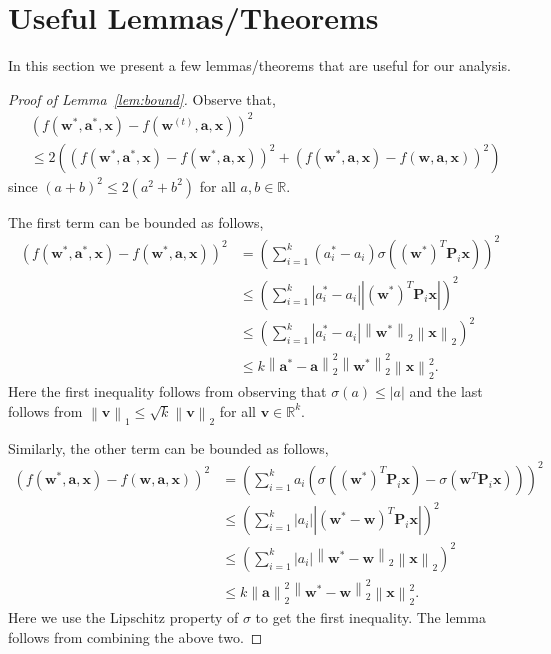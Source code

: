 \documentclass[11pt]{article}
\newcommand{\mat}[1]{\mathbf{#1}}
\newcommand{\vect}[1]{\mathbf{#1}}
\newcommand{\norm}[1]{\left\|#1\right\|}
\begin{document}



\newpage
\appendix
\section{Useful Lemmas/Theorems}\label{sec:useful_lemmas}
In this section we present a few lemmas/theorems that are useful for our analysis.

\begin{proof}[Proof of Lemma~\ref{lem:bound}]
Observe that,
\begin{align*}
&\left(f\left(\vect{w}^*, \vect{a}^*, \vect{x}\right) - f\left(\vect{w}^{\left(t\right)}, \vect{a}, \vect{x}\right)\right)^2 \\
& \leq 2\left(\left(f\left(\vect{w}^*, \vect{a}^*, \vect{x}\right) - f\left(\vect{w}^*, \vect{a}, \vect{x}\right)\right)^2 + \left(f\left(\vect{w}^*, \vect{a}, \vect{x}\right) -f\left(\vect{w}, \vect{a}, \vect{x}\right)\right)^2\right)
\end{align*}
since $\left(a + b\right)^2 \leq 2\left(a^2  + b^2\right)$ for all $a, b \in \mathbb{R}$.

The first term can be bounded as follows,
\begin{align*}
\left(f\left(\vect{w}^*, \vect{a}^*, \vect{x}\right) - f\left(\vect{w}^*, \vect{a}, \vect{x}\right)\right)^2 &= \left(\sum_{i=1}^k \left(a^*_i - a_i\right) \sigma \left(\left(\vect{w}^*\right)^T \mat{P}_i \vect{x}\right)\right)^2\\
& \leq \left(\sum_{i=1}^k |a^*_i - a_i| |\left(\vect{w}^*\right)^T \mat{P}_i \vect{x}|\right)^2\\
& \leq \left(\sum_{i=1}^k |a^*_i - a_i| \norm{\vect{w}^*}_2 \norm{\vect{x}}_2\right)^2\\
& \leq k \norm{\vect{a}^* - \vect{a}}_2^2\norm{\vect{w}^*}_2^2 \norm{\vect{x}}_2^2.
\end{align*}
Here the first inequality follows from observing that $\sigma\left(a\right) \leq |a|$ and the last follows from $\norm{\vect{v}}_1 \leq \sqrt{k} \norm{\vect{v}}_2$ for all $\vect{v} \in \mathbb{R}^k$.

Similarly, the other term can be bounded as follows,
\begin{align*}
\left(f\left(\vect{w}^*, \vect{a}, \vect{x}\right) - f\left(\vect{w}, \vect{a}, \vect{x}\right)\right)^2 &= \left(\sum_{i=1}^k a_i \left(\sigma \left(\left(\vect{w}^*\right)^T \mat{P}_i \vect{x}\right) - \sigma \left(\vect{w}^T \mat{P}_i \vect{x}\right)\right)\right)^2\\
& \leq \left(\sum_{i=1}^k |a_i| |\left(\vect{w}^* - \vect{w}\right)^T \mat{P}_i \vect{x}|\right)^2\\
& \leq \left(\sum_{i=1}^k |a_i| \norm{\vect{w}^* - \vect{w}}_2 \norm{\vect{x}}_2\right)^2\\
& \leq k \norm{\vect{a}}_2^2\norm{\vect{w}^* - \vect{w}}_2^2 \norm{\vect{x}}_2^2.
\end{align*}
Here we use the Lipschitz property of $\sigma$ to get the first inequality. The lemma follows from combining the above two.
\end{proof}
\end{document}
